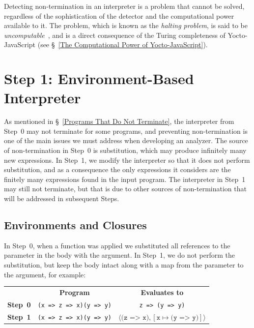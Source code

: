 \documentclass[12pt, oneside]{book}
\begin{document}
\begin{mdframed}[frametitle = {Advanced}]
Detecting non-termination in an interpreter is a problem that cannot be solved, regardless of the sophistication of the detector and the computational power available to it. The problem, which is known as the \emph{halting problem}, is said to be \emph{uncomputable}~\cite[§~8]{understanding-computation}, and is a direct consequence of the Turing completeness of Yocto-JavaScript (see §~\ref{The Computational Power of Yocto-JavaScript}).
\end{mdframed}

\section{Step 1: Environment-Based Interpreter}

As mentioned in §~\ref{Programs That Do Not Terminate}, the interpreter from Step~0 may not terminate for some programs, and preventing non-termination is one of the main issues we must address when developing an analyzer. The source of non-termination in Step~0 is substitution, which may produce infinitely many new expressions. In Step~1, we modify the interpreter so that it does not perform substitution, and as a consequence the only expressions it considers are the finitely many expressions found in the input program. The interpreter in Step~1 may still not terminate, but that is due to other sources of non-termination that will be addressed in subsequent Steps.

\subsection{Environments and Closures}

In Step~0, when a function was applied we substituted all references to the parameter in the body with the argument. In Step~1, we do not perform the substitution, but keep the body intact along with a map from the parameter to the argument, for example:

\begin{center}
\begin{tabular}{rcc}
& \textbf{Program} & \textbf{Evaluates to} \\
\textbf{Step~0} & \texttt{(x => z => x)(y => y)} & \texttt{z => (y => y)} \\
\textbf{Step~1} & \texttt{(x => z => x)(y => y)} & $\langle \texttt{(z => x)}, [\texttt{x} \mapsto \texttt{(y => y)}] \rangle$ \\
\end{tabular}
\end{center}
\end{document}
